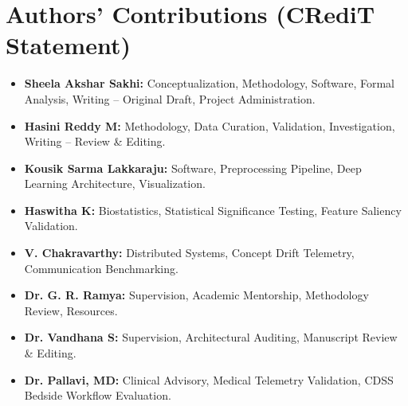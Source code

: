\documentclass[11pt,a4paper]{article}
\begin{document}
\section*{Authors' Contributions (CRediT Statement)}
\begin{itemize}[leftmargin=*]
    \item \textbf{Sheela Akshar Sakhi:} Conceptualization, Methodology, Software, Formal Analysis, Writing -- Original Draft, Project Administration.
    \item \textbf{Hasini Reddy M:} Methodology, Data Curation, Validation, Investigation, Writing -- Review \& Editing.
    \item \textbf{Kousik Sarma Lakkaraju:} Software, Preprocessing Pipeline, Deep Learning Architecture, Visualization.
    \item \textbf{Haswitha K:} Biostatistics, Statistical Significance Testing, Feature Saliency Validation.
    \item \textbf{V. Chakravarthy:} Distributed Systems, Concept Drift Telemetry, Communication Benchmarking.
    \item \textbf{Dr. G. R. Ramya:} Supervision, Academic Mentorship, Methodology Review, Resources.
    \item \textbf{Dr. Vandhana S:} Supervision, Architectural Auditing, Manuscript Review \& Editing.
    \item \textbf{Dr. Pallavi, MD:} Clinical Advisory, Medical Telemetry Validation, CDSS Bedside Workflow Evaluation.
\end{itemize}
\end{document}
